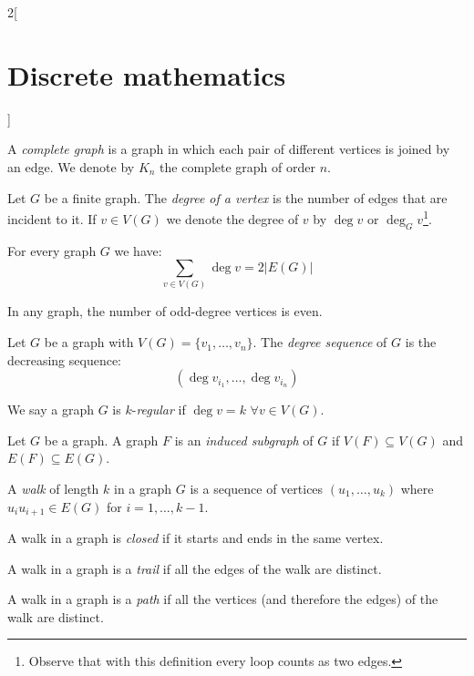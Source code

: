 \documentclass[../../../main.tex]{subfiles}
\begin{document}
\begin{multicols}{2}[\section{Discrete mathematics}]
\begin{definition}
    A \emph{complete graph} is a graph in which each pair of different vertices is joined by an edge. We denote by $K_n$ the complete graph of order $n$.
  \end{definition}
  \begin{definition}
    Let $G$ be a finite graph. The \emph{degree of a vertex} is the number of edges that are incident to it. If $v\in V(G)$ we denote the degree of $v$ by $\deg v$ or $\deg_Gv$\footnote{Observe that with this definition every loop counts as two edges.}.
  \end{definition}
  \begin{lemma}
    For every graph $G$ we have: $$\sum_{v\in V(G)}\deg v=2|E(G)|$$
  \end{lemma}
  \begin{corollary}
    In any graph, the number of odd-degree vertices is even.
  \end{corollary}
  \begin{definition}
    Let $G$ be a graph with $V(G)=\{v_1,\ldots,v_n\}$. The \emph{degree sequence} of $G$ is the decreasing sequence: $$(\deg v_{i_1},\ldots,\deg v_{i_n})$$
  \end{definition}
  \begin{definition}
    We say a graph $G$ is $k$-\emph{regular} if $\deg v=k$ $\forall v\in V(G)$.
  \end{definition}
  \begin{definition}
    Let $G$ be a graph. A graph $F$ is an \emph{induced subgraph} of $G$ if $V(F)\subseteq V(G)$ and $E(F)\subseteq E(G)$.
  \end{definition}
  \begin{definition}
    A \emph{walk} of length $k$ in a graph $G$ is a sequence of vertices $(u_1,\ldots,u_k)$ where $u_iu_{i+1}\in E(G)$ for $i=1,\ldots,k-1$.
  \end{definition}
  \begin{definition}
    A walk in a graph is \emph{closed} if it starts and ends in the same vertex.
  \end{definition}
  \begin{definition}
    A walk in a graph is a \emph{trail} if all the edges of the walk are distinct.
  \end{definition}
  \begin{definition}
    A walk in a graph is a \emph{path} if all the vertices (and therefore the edges) of the walk are distinct.
  \end{definition}
  \begin{definition}

\end{definition}
\end{multicols}
\end{document}
